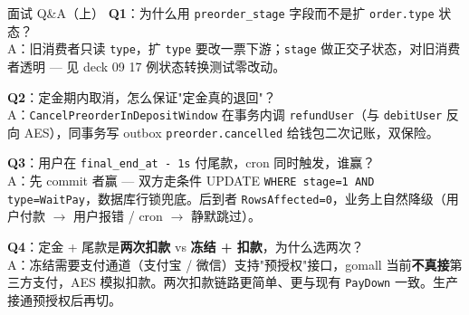 \documentclass[aspectratio=169,11pt]{beamer}
\begin{document}
\begin{frame}[shrink]{面试 Q\&A（上）}
\textbf{Q1}：为什么用 \texttt{preorder\_stage} 字段而不是扩 \texttt{order.type} 状态？\\
\hspace{4mm}\small A：旧消费者只读 \texttt{type}，扩 \texttt{type} 要改一票下游；\texttt{stage} 做正交子状态，对旧消费者透明 — 见 deck 09 17 例状态转换测试零改动。

\vspace{2mm}
\textbf{Q2}：定金期内取消，怎么保证"定金真的退回"？\\
\hspace{4mm}\small A：\texttt{CancelPreorderInDepositWindow} 在事务内调 \texttt{refundUser}（与 \texttt{debitUser} 反向 AES），同事务写 outbox \texttt{preorder.cancelled} 给钱包二次记账，双保险。

\vspace{2mm}
\textbf{Q3}：用户在 \texttt{final\_end\_at - 1s} 付尾款，cron 同时触发，谁赢？\\
\hspace{4mm}\small A：先 commit 者赢 — 双方走条件 UPDATE \texttt{WHERE stage=1 AND type=WaitPay}，数据库行锁兜底。后到者 \texttt{RowsAffected=0}，业务上自然降级（用户付款 $\to$ 用户报错 / cron $\to$ 静默跳过）。

\vspace{2mm}
\textbf{Q4}：定金 + 尾款是\textbf{两次扣款} vs \textbf{冻结 + 扣款}，为什么选两次？\\
\hspace{4mm}\small A：冻结需要支付通道（支付宝 / 微信）支持"预授权"接口，gomall 当前\textbf{不真接}第三方支付，AES 模拟扣款。两次扣款链路更简单、更与现有 \texttt{PayDown} 一致。生产接通预授权后再切。
\end{frame}
\end{document}
